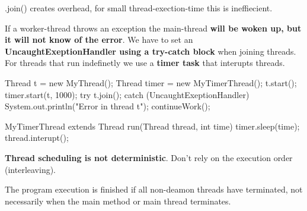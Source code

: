 \begin{remark}
.join() creates overhead, for small thread-exection-time this is ineffiecient.
\end{remark}

\begin{important}
If a worker-thread throws an exception the main-thread \textbf{will be woken up, but it will not know of the
error}. We have to set an \textbf{UncaughtExeptionHandler using a try-catch block} when joining threads. For threads that
run indefinetly we use a \textbf{timer task} that interupts threads.
\end{important}

\begin{codeexample}
Thread t = new MyThread();
Thread timer = new MyTimerThread();
t.start();
timer.start(t, 1000);
try {
    t.join();
} catch (UncaughtExeptionHandler) {
    System.out.println("Error in thread t");
}
continueWork();

MyTimerThread extends Thread {
    run(Thread thread, int time) {
        timer.sleep(time);
        thread.interupt();
    }
}
\end{codeexample}

\begin{important}
\textbf{Thread scheduling is not deterministic}. Don't rely on the execution order (interleaving).
\end{important}

\begin{important}
The program execution is finished if all non-deamon threads have terminated, not necessarily when the main method or main thread terminates.
\end{important}

